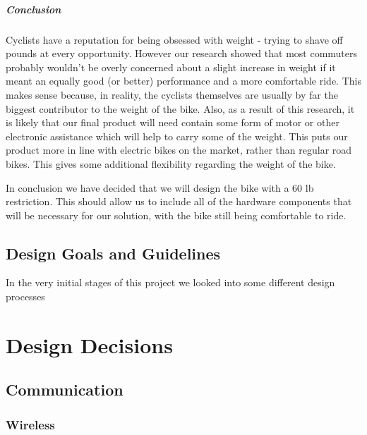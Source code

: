 \documentclass[]{report}
\begin{document}
\paragraph{Conclusion}
Cyclists have a reputation for being obsessed with weight - trying to shave off pounds at every opportunity. However our research showed that most commuters probably wouldn't be overly concerned about a slight increase in weight if it meant an equally good (or better) performance and a more comfortable ride. This makes sense because, in reality, the cyclists themselves are usually by far the biggest contributor to the weight of the bike. Also, as a result of this research, it is likely that our final product will need contain some form of motor or other electronic assistance which will help to carry some of the weight. This puts our product more in line with electric bikes on the market, rather than regular road bikes. This gives some additional flexibility regarding the weight of the bike.

In conclusion we have decided that we will design the bike with a 60 lb restriction. This should allow us to include all of the hardware components that will be necessary for our solution, with the bike still being comfortable to ride. 

\section{Design Goals and Guidelines}
In the very initial stages of this project we looked into some different design processes

\chapter{Design Decisions}

\section{Communication}

\subsection{Wireless}
\end{document}

